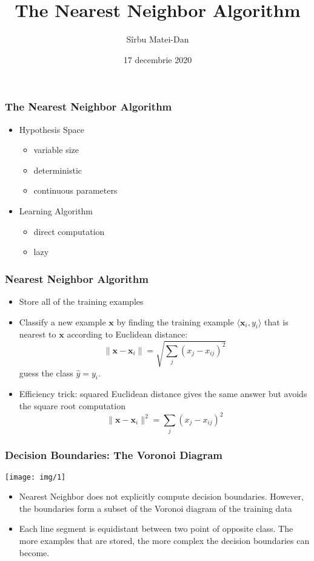 \documentclass{beamer}
\title{\bf The Nearest Neighbor Algorithm}
\author[hello@msirbu.eu]{Sîrbu Matei-Dan}
\institute[]{Universitatea Transilvania din Brașov \\ Facultatea de Matematică și Informatică}
\date{17 decembrie 2020}
\newcommand*{\utb}{\item[{\texttt{[image: img/UTSymbols-Bullet.png]}}]}
\begin{document}
\frame{\titlepage}

\begin{frame}
    \frametitle{The Nearest Neighbor Algorithm}
    \begin{itemize}
        \utb Hypothesis Space
        \begin{itemize}
            \utb variable size
            \utb deterministic
            \utb continuous parameters
        \end{itemize}
    \end{itemize}
    \begin{itemize}
        \utb Learning Algorithm
        \begin{itemize}
            \utb direct computation
            \utb lazy
        \end{itemize}
    \end{itemize}
\end{frame}

\begin{frame}
    \frametitle{Nearest Neighbor Algorithm}
    \begin{itemize}
        \utb Store all of the training examples
        \utb Classify a new example $\mathbf{x}$ by finding the training example $\langle \mathbf{x}_i, y_i \rangle$ that is nearest to $\mathbf{x}$ according to Euclidean distance: $$\lVert \mathbf{x} - \mathbf{x}_i \rVert = \sqrt{\sum_j (x_j - x_{ij})^2}$$
        guess the class $\hat{y} = y_i$.
        \utb Efficiency trick: squared Euclidean distance gives the same answer but avoids the square root computation $$\lVert \mathbf{x} - \mathbf{x}_i \rVert^2 = \sum_j (x_j - x_{ij})^2$$
    \end{itemize}
\end{frame}

\begin{frame}
    \frametitle{Decision Boundaries: The Voronoi Diagram}
    \begin{center}
        \texttt{[image: img/1]}
    \end{center}
    \begin{itemize}
        \utb Nearest Neighbor does not explicitly compute decision boundaries. However, the boundaries form a subset of the Voronoi diagram of the training data
        \utb Each line segment is equidistant between two point of opposite class. The more examples that are stored, the more complex the decision boundaries can become.
    \end{itemize}
\end{frame}
\end{document}

